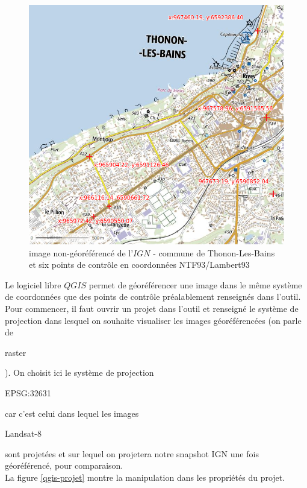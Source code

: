 \documentclass{book}
\begin{document}
\begin{figure}[H]
\begin{center}
\includegraphics[scale=0.5]{images/ign-points-Thonon.png}
\end{center}
\caption{image non-géoréférencé de l'$IGN$ - commune de Thonon-Les-Bains et six points de contr\^{o}le en coordonnées NTF93/Lambert93}
\label{ign-points}
\end{figure}

\clearpage

Le logiciel libre $QGIS$ \cite{QGIS_software} permet de géoréférencer une image dans le même système de coordonnées que des points de
contr\^{o}le préalablement renseignés dans l'outil.\\
Pour commencer, il faut ouvrir un projet dans l'outil et renseigné le système de projection dans lesquel on souhaite visualiser
les images géoréférencées (on parle de \begin{itshape}raster\end{itshape}). On choisit ici le système de projection
\begin{itshape}EPSG:32631\end{itshape} car c'est celui dans lequel les images \begin{itshape}Landsat-8\end{itshape} sont projetées et
sur lequel on projetera notre snapshot IGN une fois géoréférencé, pour comparaison.\\
La figure \ref{qgis-projet} montre la manipulation dans les propriétés du projet.
\end{document}
